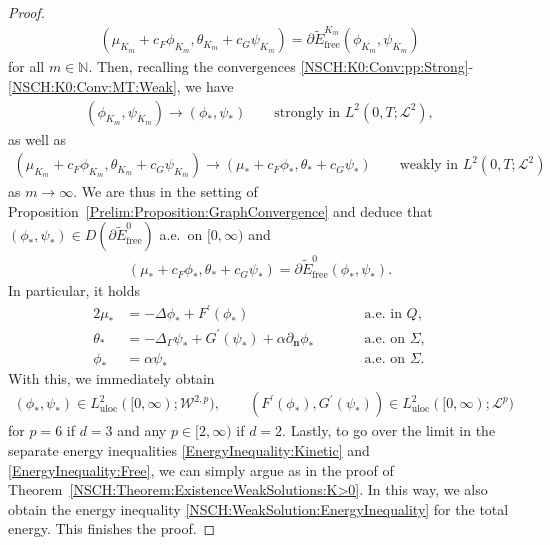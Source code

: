 \documentclass[11pt,reqno]{amsart}
\theoremstyle{remark}
\numberwithin{equation}{section}
\newcommand{\N}{\mathbb N}
\newcommand{\n}{\mathbf{n}}
\newcommand{\deln}{\partial_\n}
\newcommand{\Lap}{\Delta}
\newcommand{\Lapg}{\Delta_\Ga}
\newcommand{\Ga}{\Gamma}
\newcommand{\uloc}{\mathrm{uloc}}
\newcommand{\free}{\mathrm{free}}
\begin{document}
\begin{proof}
    \begin{align*}
        (\mu_{K_m}+c_F\phi_{K_m},\theta_{K_m}+c_G\psi_{K_m}) = \partial \widetilde E_\free^{K_m}(\phi_{K_m},\psi_{K_m})
    \end{align*}
    for all $m\in\N$. Then, recalling the convergences \eqref{NSCH:K0:Conv:pp:Strong}-\eqref{NSCH:K0:Conv:MT:Weak}, we have
    \begin{align*}
        (\phi_{K_m},\psi_{K_m})\rightarrow(\phi_\ast,\psi_\ast) \qquad\text{strongly in~} L^2(0,T;\mathcal{L}^2),
    \end{align*}
    as well as
    \begin{align*}
        (\mu_{K_m}+c_F\phi_{K_m},\theta_{K_m}+c_G\psi_{K_m}) \rightarrow (\mu_\ast+c_F\phi_\ast,\theta_\ast+c_G\psi_\ast) \qquad\text{weakly in~}L^2(0,T;\mathcal{L}^2)
    \end{align*}
    as $m\rightarrow\infty$. We are thus in the setting of Proposition~\ref{Prelim:Proposition:GraphConvergence} and deduce that $(\phi_\ast,\psi_\ast)\in D(\partial\widetilde E_\free^0)$ a.e.~on $[0,\infty)$ and
    \begin{align*}
        (\mu_\ast + c_F\phi_\ast,\theta_\ast + c_G\psi_\ast) = \partial\widetilde E_\free^0(\phi_\ast,\psi_\ast).
    \end{align*}
    In particular, it holds
    \begin{alignat*}{2}
        \mu_\ast &= -\Lap\phi_\ast + F^\prime(\phi_\ast) &&\qquad\text{a.e.~in~}Q, \\
        \theta_\ast &= -\Lapg\psi_\ast + G^\prime(\psi_\ast) + \alpha\deln\phi_\ast &&\qquad\text{a.e.~on~}\Sigma, \\
        \phi_\ast &= \alpha\psi_\ast &&\qquad\text{a.e.~on~}\Sigma.
    \end{alignat*}
    With this, we immediately obtain
    \begin{align*}
        (\phi_\ast,\psi_\ast)\in L^2_\uloc([0,\infty);\mathcal{W}^{2,p}), \qquad (F^\prime(\phi_\ast),G^\prime(\psi_\ast))\in L^2_\uloc([0,\infty);\mathcal{L}^p)
    \end{align*}
    for $p = 6$ if $d = 3$ and any $p\in[2,\infty)$ if $d = 2$. Lastly, to go over the limit in the separate energy inequalities \eqref{EnergyInequality:Kinetic} and \eqref{EnergyInequality:Free}, we can simply argue as in the proof of Theorem~\ref{NSCH:Theorem:ExistenceWeakSolutions:K>0}. In this way, we also obtain the energy inequality \eqref{NSCH:WeakSolution:EnergyInequality} for the total energy. This finishes the proof.
\end{proof}
\end{document}

